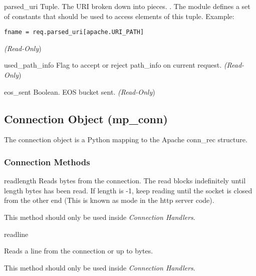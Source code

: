 \begin{memberdesc}[request]{parsed_uri}
Tuple. The URI broken down into pieces.
. 
The  module defines a set of  constants that
should be used to access elements of this tuple. Example:
\begin{verbatim}
fname = req.parsed_uri[apache.URI_PATH]
\end{verbatim}
\emph{(Read-Only})
\end{memberdesc}

\begin{memberdesc}[request]{used_path_info}
Flag to accept or reject path_info on current request.
\emph{(Read-Only})
\end{memberdesc}

\begin{memberdesc}[request]{eos_sent}
Boolean. EOS bucket sent.
\emph{(Read-Only})
\end{memberdesc}

\subsection{Connection Object (mp_conn)\label{pyapi-mpconn}}

The connection object is a Python mapping to the Apache conn_rec
structure.

\subsubsection{Connection Methods\label{pyapi-mpconn-meth}}

\begin{methoddesc}[connection]{read}{length}
Reads  bytes from the connection. The read blocks
indefinitely until length bytes has been read. If length is -1, keep
reading until the socket is closed from the other end (This is known
as  mode in the http server code).

This method should only be used inside \emph{Connection Handlers}.

\end{methoddesc}

\begin{methoddesc}[connection]{readline}{}

Reads a line from the connection or up to  bytes.

This method should only be used inside \emph{Connection Handlers}.

\end{methoddesc}

